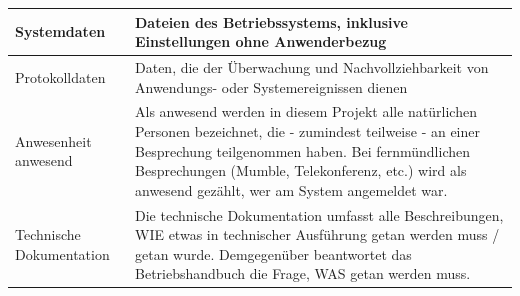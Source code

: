 \begin{center}
\begin{longtable}{p{3.2cm}p{12cm}}
\midrule
Systemdaten & Dateien des Betriebssystems, inklusive Einstellungen ohne Anwenderbezug \\
\midrule
Protokolldaten & Daten, die der Überwachung und Nachvollziehbarkeit von Anwendungs- oder Systemereignissen dienen \\
\midrule
Anwesenheit \newline anwesend & Als anwesend werden in diesem Projekt alle natürlichen Personen bezeichnet, die - zumindest teilweise - an einer Besprechung teilgenommen haben. Bei fernmündlichen Besprechungen (Mumble, Telekonferenz, etc.) wird als anwesend gezählt, wer am System angemeldet war. \\
\midrule
Technische \newline Dokumentation & Die technische Dokumentation umfasst alle Beschreibungen, WIE etwas in technischer Ausführung getan werden muss / getan wurde. Demgegenüber beantwortet das Betriebshandbuch die Frage, WAS getan werden muss. \\
\bottomrule
\end{longtable}
\end{center}


\newpage
\printbibliography

\appendix




